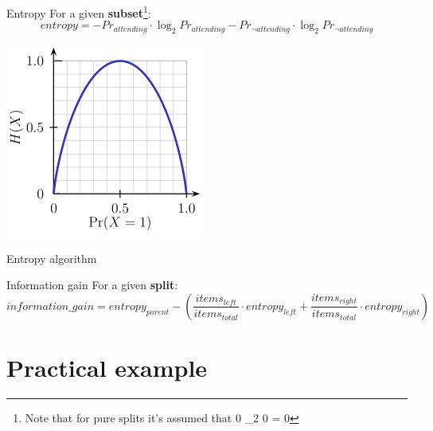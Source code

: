 \begin{frame}[fragile]{Entropy}
    For a given \textbf{subset}\footnote{Note that for pure splits it's assumed that 0 \cdot \log_{2} 0 = 0}:
    \begin{equation}
        entropy = - Pr_{attending} \cdot \log_{2} Pr_{attending} - Pr_{\neg attending} \cdot \log_{2} Pr_{\neg attending}
    \end{equation}
    \begin{center}
        \includegraphics[scale=.5]{images/entropy}
    \end{center}
\end{frame}

\begin{frame}[fragile]{Entropy algorithm}
    
\end{frame}

\begin{frame}[fragile]{Information gain}
    For a given \textbf{split}:
    \begin{equation}
        information\_gain = entropy_{parent} - \left( \frac{items_{left}}{items_{total}} \cdot entropy_{left} + \frac{items_{right}}{items_{total}} \cdot entropy_{right} \right)
    \end{equation}

\end{frame}

\section{Practical example}

